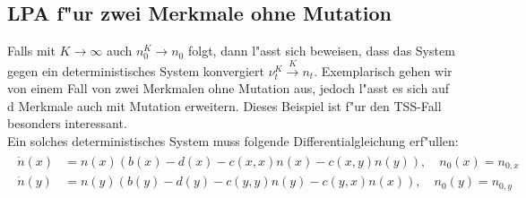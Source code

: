 \documentclass[11pt, a4paper, german]{article}
\theoremstyle{plain}
\begin{document}
	\subsection{LPA f"ur zwei Merkmale ohne Mutation}
	Falls mit $ K \to \infty $ auch $ n_0^K \to n_0 $ folgt, dann l"asst sich beweisen, dass das System gegen ein deterministisches System konvergiert $ \nu_t^K \xrightarrow{K} n_t $. Exemplarisch gehen wir von einem Fall von zwei Merkmalen ohne Mutation aus, jedoch l"asst es sich auf d Merkmale auch mit Mutation erweitern. Dieses Beispiel ist f"ur den TSS-Fall besonders interessant.\\
	Ein solches deterministisches System muss folgende Differentialgleichung erf"ullen:
	\begin{align}
	\begin{split}
		\dot{n}(x) &= n(x) \left( b(x) - d(x) - c(x,x) n(x) - c(x,y) n(y) \right), \quad n_0(x) = n_{0,x}\\
		\dot{n}(y) &= n(y) \left( b(y) - d(y) - c(y,y) n(y) - c(y,x) n(x) \right), \quad n_0(y) = n_{0,y} \label{Differentialgleichung}
	\end{split}
	\end{align}
	
\end{document}
